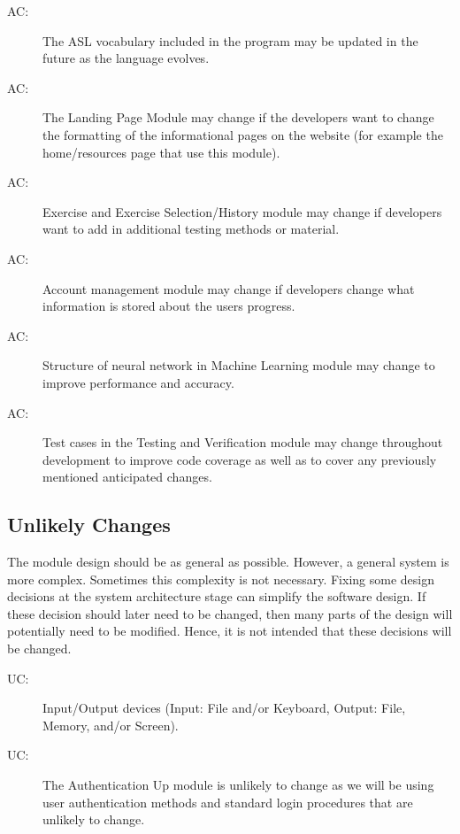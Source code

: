 \documentclass[12pt, titlepage]{article}
\newcounter{acnum}
\newcommand{\actheacnum}{AC\theacnum}
\newcounter{ucnum}
\newcommand{\uctheucnum}{UC\theucnum}
\begin{document}
\begin{description}
\item[ \actheacnum \label{acInfo}:] The ASL vocabulary included in the program may be updated in the future as the language evolves.
\item[ \actheacnum \label{acAbout}:] The Landing Page Module may change if the developers want to change the formatting of the informational pages on the website (for example the home/resources page that use this module). 
\item[ \actheacnum \label{acExercise}:] Exercise and Exercise Selection/History module may change if developers want to add in additional testing methods or material.
\item[ \actheacnum \label{acAccount}:] Account management module may change if developers change what information is stored about the users progress. 
\item[ \actheacnum \label{acMLModel}:] Structure of neural network in Machine Learning module may change to improve performance and accuracy.
\item[ \actheacnum \label{acTestVerif}:] Test cases in the Testing and Verification module may change throughout development to improve code coverage as well as to cover any previously mentioned anticipated changes.
\end{description}

\subsection{Unlikely Changes} \label{SecUchange}

The module design should be as general as possible. However, a general system is
more complex. Sometimes this complexity is not necessary. Fixing some design
decisions at the system architecture stage can simplify the software design. If
these decision should later need to be changed, then many parts of the design
will potentially need to be modified. Hence, it is not intended that these
decisions will be changed.

\begin{description}
\item[ \uctheucnum \label{ucIO}:] Input/Output devices
  (Input: File and/or Keyboard, Output: File, Memory, and/or Screen).
\item[ \uctheucnum \label{ucLogin}:] The Authentication Up module is unlikely to change as we will be using user authentication methods and standard login procedures that are unlikely to change.
\end{description}
\end{document}
